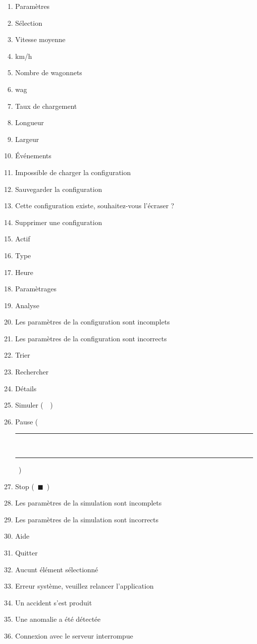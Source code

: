\begin{enumerate}
	\item Paramètres \urt
	\item Sélection \urt
	\item Vitesse moyenne \urt
	\item km/h \urt
	\item Nombre de wagonnets \urt
	\item wag \urt
	\item Taux de chargement \urt
	\item Longueur \urt
	\item Largeur \urt
	\item Événements
	\item Impossible de charger la configuration \urt
	\item Sauvegarder la configuration \urt
	\item Cette configuration existe, souhaitez-vous l'écraser ? \urt
	\item Supprimer une configuration \urt
	\item Actif
	\item Type
	\item Heure
	\item Paramètrages
	\item Analyse
	\item Les paramètres de la configuration sont incomplets \urt
	\item Les paramètres de la configuration sont incorrects \urt
	\item Trier
	\item Rechercher
	\item Détails
	\item Simuler (~~)
	\item Pause (~\rule[-1pt]{2pt}{0.8em}~\rule[-1pt]{2pt}{0.8em}~)
	\item Stop (~$\blacksquare$~)
	\item Les paramètres de la simulation sont incomplets
	\item Les paramètres de la simulation sont incorrects
	\item Aide
	\item Quitter
	\item Aucunt élément sélectionné
	\item Erreur système, veuillez relancer l'application
	\item Un accident s'est produit
	\item Une anomalie a été détectée
	\item Connexion avec le serveur interrompue
\end{enumerate}
